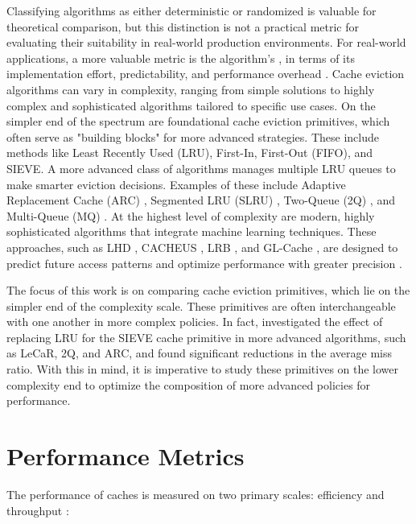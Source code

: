 Classifying algorithms as either deterministic or randomized is valuable for theoretical comparison, but this distinction is not a practical metric for evaluating their suitability in real-world production environments. For real-world applications, a more valuable metric is the algorithm's , in terms of its implementation effort, predictability, and performance overhead \cite{sieve, s3-fifo}. Cache eviction algorithms can vary in complexity, ranging from simple solutions to highly complex and sophisticated algorithms tailored to specific use cases. On the simpler end of the spectrum are foundational cache eviction primitives, which often serve as "building blocks" for more advanced strategies. These include methods like Least Recently Used (LRU), First-In, First-Out (FIFO), and SIEVE. A more advanced class of algorithms manages multiple LRU queues to make smarter eviction decisions. Examples of these include Adaptive Replacement Cache (ARC) \cite{alg-arc}, Segmented LRU (SLRU) \cite{alg-ss-lru}, Two-Queue (2Q) \cite{alg-2q}, and Multi-Queue (MQ) \cite{alg-mq}. At the highest level of complexity are modern, highly sophisticated algorithms that integrate machine learning techniques. These approaches, such as LHD \cite{alg-lhd}, CACHEUS \cite{alg-cacheus}, LRB \cite{alg-lrb}, and GL-Cache \cite{alg-gl-cache}, are designed to predict future access patterns and optimize performance with greater precision \cite{sieve}.

The focus of this work is on comparing cache eviction primitives, which lie on the simpler end of the complexity scale. These primitives are often interchangeable with one another in more complex policies. In fact, \citeauthor{sieve} \cite{sieve} investigated the effect of replacing LRU for the SIEVE cache primitive in more advanced algorithms, such as LeCaR, 2Q, and ARC, and found significant reductions in the average miss ratio. With this in mind, it is imperative to study these primitives on the lower complexity end to optimize the composition of more advanced policies for performance.


\section{Performance Metrics}


The performance of caches is measured on two primary scales: efficiency and throughput \cite{sieve}:

